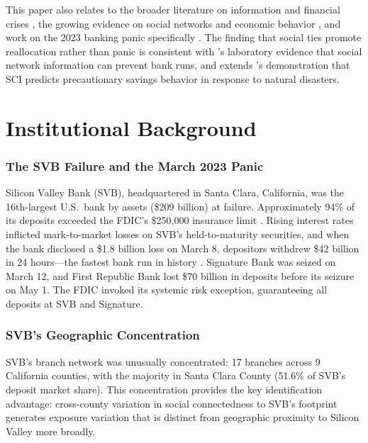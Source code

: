 \documentclass[12pt]{article}
\begin{document}
This paper also relates to the broader literature on information and financial crises \citep{Bernanke1983, AllenGale2000, AcharyaYorulmazer2008, HeManaresshi2012}, the growing evidence on social networks and economic behavior \citep{Baileyetal2018, Baileyetal2020, Kuchleretal2022}, and work on the 2023 banking panic specifically \citep{JiangYang2023, Granja2023, Choietal2023}. The finding that social ties promote reallocation rather than panic is consistent with \citet{KissRodriguezLamas2014}'s laboratory evidence that social network information can prevent bank runs, and extends \citet{FlynnWang2025}'s demonstration that SCI predicts precautionary savings behavior in response to natural disasters.

\section{Institutional Background}

\subsubsection*{The SVB Failure and the March 2023 Panic} Silicon Valley Bank (SVB), headquartered in Santa Clara, California, was the 16th-largest U.S.\ bank by assets (\$209 billion) at failure. Approximately 94\% of its deposits exceeded the FDIC's \$250,000 insurance limit \citep{FDIC2023}. Rising interest rates inflicted mark-to-market losses on SVB's held-to-maturity securities, and when the bank disclosed a \$1.8 billion loss on March 8, depositors withdrew \$42 billion in 24 hours---the fastest bank run in history \citep{Barr2023}. Signature Bank was seized on March 12, and First Republic Bank lost \$70 billion in deposits before its seizure on May 1. The FDIC invoked its systemic risk exception, guaranteeing all deposits at SVB and Signature.

\subsubsection*{SVB's Geographic Concentration} SVB's branch network was unusually concentrated: 17 branches across 9 California counties, with the majority in Santa Clara County (51.6\% of SVB's deposit market share). This concentration provides the key identification advantage: cross-county variation in social connectedness to SVB's footprint generates exposure variation that is distinct from geographic proximity to Silicon Valley more broadly.
\end{document}
